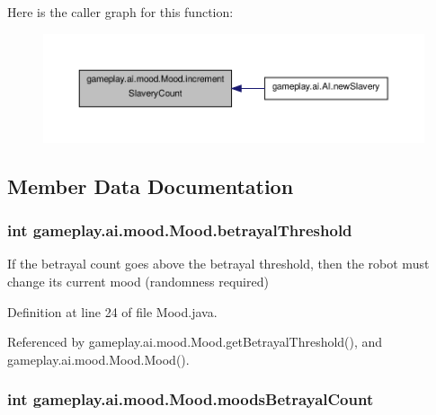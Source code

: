 Here is the caller graph for this function\-:
\nopagebreak
\begin{figure}[H]
\begin{center}
\leavevmode
\includegraphics[width=350pt]{a00015_ac416312a82ad5afce4090858b47b0c96_icgraph}
\end{center}
\end{figure}




\subsection{Member Data Documentation}
\hypertarget{a00015_af8ba28f8a5e568f223c07e0acb788be9}{
\subsubsection[{betrayal\-Threshold}]{\setlength{\rightskip}{0pt plus 5cm}int gameplay.\-ai.\-mood.\-Mood.\-betrayal\-Threshold\hspace{0.3cm}{\ttfamily [protected]}}}\label{a00015_af8ba28f8a5e568f223c07e0acb788be9}


If the betrayal count goes above the betrayal threshold, then the robot must change its current mood (randomness required) 



Definition at line 24 of file Mood.\-java.



Referenced by gameplay.\-ai.\-mood.\-Mood.\-get\-Betrayal\-Threshold(), and gameplay.\-ai.\-mood.\-Mood.\-Mood().

\hypertarget{a00015_ae300727f17efc1d32e7cc1731f9935fa}{
\subsubsection[{moods\-Betrayal\-Count}]{\setlength{\rightskip}{0pt plus 5cm}int gameplay.\-ai.\-mood.\-Mood.\-moods\-Betrayal\-Count\hspace{0.3cm}{\ttfamily [protected]}}}\label{a00015_ae300727f17efc1d32e7cc1731f9935fa}


